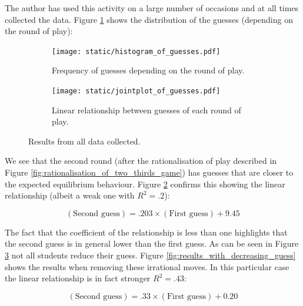 \documentclass{article}
\begin{document}
The author has used this activity on a large number of occasions and at all
times collected the data. Figure \ref{fig:histogram_of_guess} shows the
distribution of the guesses (depending on the round of play):

\begin{figure}[!hbtp]
    \begin{subfigure}{.6\textwidth}
        \centering
        \texttt{[image: static/histogram\_of\_guesses.pdf]}
        \caption{Frequency of guesses depending on the round of play.}
        \label{fig:histogram_of_guess}
    \end{subfigure}
    \begin{subfigure}{.4\textwidth}
        \centering
        \texttt{[image: static/jointplot\_of\_guesses.pdf]}
        \caption{Linear relationship between guesses of each round of play.}
        \label{fig:jointplot_of_guess}
    \end{subfigure}
    \caption{Results from all data collected.}
    \label{fig:all_results}
\end{figure}

We see that the second round (after the rationalisation of play described in
Figure \ref{fig:rationalisation_of_two_thirds_game}) has guesses that are closer
to the expected equilibrium behaviour.
Figure \ref{fig:jointplot_of_guess} confirms this showing the linear
relationship (albeit a weak one with \(R^2=.2\)):

\begin{equation}
    (\text{Second guess}) = .203\times(\text{First guess}) + 9.45
    \label{eq:linear_relationship}
\end{equation}

The fact that the coefficient of the relationship is less than one highlights
that the second guess is in general lower than the first guess. As can be seen
in Figure \ref{fig:all_results} not all students reduce their guess. Figure
\ref{fig:results_with_decreasing_guess} shows the results when removing these
irrational moves. In this particular case the linear relationship is in fact
stronger \(R^2=.43\):

\begin{equation}
    (\text{Second guess}) = .33\times(\text{First guess}) + 0.20
    \label{eq:linear_relationship_for_increasing_guesses}
\end{equation}
\end{document}
